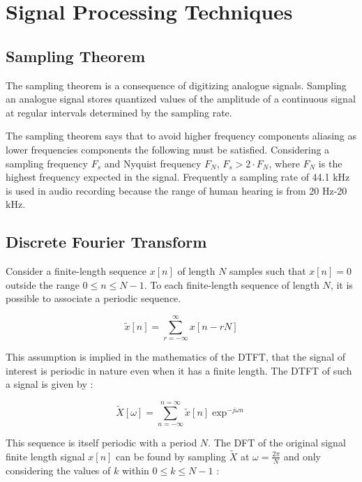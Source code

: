 \section{Signal Processing Techniques}
\subsection{Sampling Theorem}

The sampling theorem is a consequence of digitizing analogue signals. Sampling
an analogue signal stores quantized values of the amplitude of a continuous
signal at regular intervals determined by the sampling rate.

The sampling theorem says that to avoid higher frequency components aliasing as
lower frequencies components the following must be satisfied. Considering a
sampling frequency $F_{s}$ and Nyquist frequency $F_{N}$, $F_{s} > 2\cdot F_{N}$,
where $F_{N}$ is the highest frequency expected in the signal. Frequently a sampling
rate of 44.1 $\si{\kilo\hertz}$ is used in audio recording because the range of
human hearing is from 20 $\si{\hertz}$-20 $\si{\kilo\hertz}$.

\subsection{Discrete Fourier Transform}

Consider a finite-length sequence $x[n]$ of length $N$ samples such that $x[n] =
  0$ outside the range $0 \leq  n \leq N - 1$. To each finite-length sequence of
length $N$, it is possible to associate a periodic sequence.

\begin{equation}
  \tilde{x}[n] =\sum_{r=-\infty}^{\infty} x[n-r N]
\end{equation}

This assumption is implied in the mathematics of the \ac{DTFT}, that the signal of interest is
periodic in nature even when it has a finite length. The \ac{DTFT} of such a signal is given by :

\begin{equation}
  \tilde{X}[\omega] =\sum_{n=-\infty}^{n=\infty} \tilde{x}[n] \exp^{-j \omega n }
\end{equation}

This sequence is itself periodic with a period $N$. The \ac{DFT} of the original signal finite length signal $x[n]$ can be found
by sampling $\tilde{X}$ at $\omega=\frac{2 \pi}{N}$ and only considering the
values of $k$ within $0 \leq  k \leq N - 1$ :

